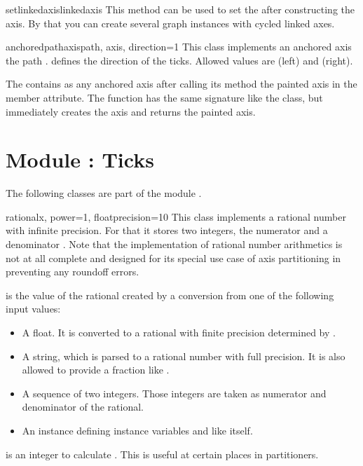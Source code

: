 \begin{methoddesc}{setlinkedaxis}{linkedaxis}
  This method can be used to set the  after
  constructing the axis. By that you can create several graph
  instances with cycled linked axes.
\end{methoddesc}

\begin{classdesc}{anchoredpathaxis}{path, axis, direction=1}
  This class implements an anchored axis the path .
   defines the direction of the ticks. Allowed values
  are  (left) and  (right).
\end{classdesc}

The  contains as any anchored axis after
calling its  method the painted axis in the
 member attribute. The function  has
the same signature like the  class, but
immediately creates the axis and returns the painted axis. %

\section{Module : Ticks} %


The following classes are part of the module .

\begin{classdesc}{rational}{x, power=1, floatprecision=10}
  This class implements a rational number with infinite precision. For
  that it stores two integers, the numerator  and a
  denominator . Note that the implementation of rational
  number arithmetics is not at all complete and designed for its
  special use case of axis partitioning in \PyX{} preventing any
  roundoff errors.

   is the value of the rational created by a conversion from
  one of the following input values:
  \begin{itemize}
  \item A float. It is converted to a rational with finite precision
    determined by .
  \item A string, which is parsed to a rational number with full
    precision. It is also allowed to provide a fraction like
    .
  \item A sequence of two integers. Those integers are taken as
    numerator and denominator of the rational.
  \item An instance defining instance variables  and
   like  itself.
  \end{itemize}

   is an integer to calculate .
  This is useful at certain places in partitioners.
\end{classdesc}

